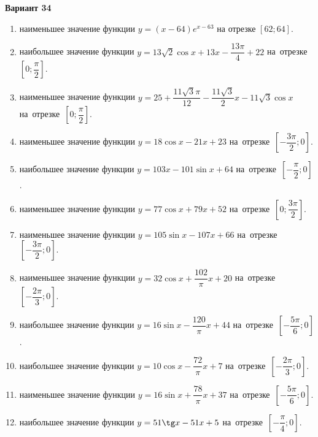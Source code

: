 \documentclass[a4paper,10pt]{article}
\begin{document}
\begin{center}\Large\textbf{Вариант 34}\end{center}

\begin{enumerate}
\item {} наименьшее значение функции $y = \left(x-64\right)e^{x-63}$ на отрезке $\left[62;64\right]$.

\item {} наибольшее значение функции $y = 13\sqrt{2}\cos x+13x-\dfrac{13\pi}{4} +22$ на~отрезке~$\left[0;\dfrac{\pi }{2}\right]$.

\item {} наименьшее значение функции $y = 25+\dfrac{11\sqrt{3} \pi}{12}-\dfrac{11\sqrt{3}}{2}x-11\sqrt{3}\cos x$ на~отрезке~$\left[0;\dfrac{\pi }{2}\right]$.

\item {} наименьшее значение функции $y = 18\cos x-21x+23$ на~отрезке~$\left[-\dfrac{3\pi }{2};0\right]$.

\item {} наибольшее значение функции $y = 103x-101\sin x+64$ на~отрезке~$\left[-\dfrac{\pi }{2};0\right]$.

\item {} наименьшее значение функции $y = 77\cos x+79x+52$ на~отрезке~$\left[0;\dfrac{3\pi }{2}\right]$.

\item {} наименьшее значение функции $y = 105\sin x-107x+66$ на~отрезке~$\left[-\dfrac{3\pi }{2};0\right]$.

\item {} наименьшее значение функции $y = 32\cos x+\dfrac{102}{\pi }x +20$ на~отрезке~$\left[-\dfrac{2\pi }{3};0\right]$.

\item {} наибольшее значение функции $y = 16\sin x-\dfrac{120}{\pi }x+44$ на~отрезке~$\left[-\dfrac{5\pi }{6};0\right]$.

\item {} наибольшее значение функции $y = 10\cos x-\dfrac{72}{\pi }x+7$ на~отрезке~$\left[-\dfrac{2\pi }{3};0\right]$.

\item {} наименьшее значение функции $y = 16\sin x+\dfrac{78}{\pi }x+37$ на~отрезке~$\left[-\dfrac{5\pi }{6};0\right]$.

\item {} наибольшее значение функции $y = 51\tg x-51x+5$ на~отрезке~$\left[-\dfrac{\pi }{4};0\right]$.


\end{enumerate}
\end{document}

